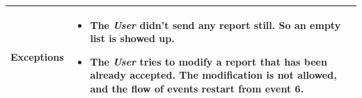 \begin{table}[H]
\begin{tabular}{|l|p{}|}
\textbf{Exceptions} &    \begin{itemize}
    \item The \textit{User} didn't send any report still. So an empty list is showed up.
    \item The \textit{User} tries to modify a report that has been already accepted. The modification is not allowed, and the flow of events restart from event 6.
   

\end{itemize}
  
                           \\ \hline

\end{tabular}
\end{table}









